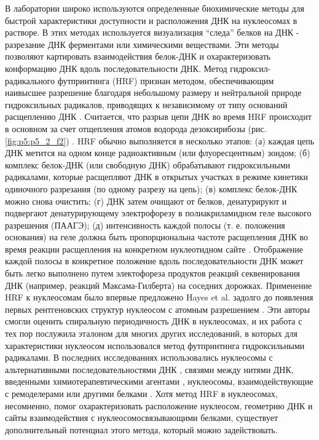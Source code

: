 В лаборатории широко используются определенные биохимические методы для быстрой характеристики доступности и расположения ДНК на нуклеосомах в растворе. В этих методах используется визуализация ``следа'' белков на ДНК - разрезание ДНК ферментами или химическими веществами. Эти методы позволяют картировать взаимодействия белок-ДНК и охарактеризовать конформацию ДНК вдоль последовательности ДНК. Метод гидроксил-радикального футпринтинга (HRF) признан методом, обеспечивающим наивысшее разрешение благодаря небольшому размеру и нейтральной природе гидроксильных радикалов, приводящих к независимому от типу оснований расщеплению ДНК \cite{jain_footprinting_2008-1}. Считается, что разрыв цепи ДНК во время HRF происходит в основном за счет отщепления атомов водорода дезоксирибозы (рис.\ref{fig:p5:p5_2_f2}) \cite{pogozelski_oxidative_1998}. HRF обычно выполняется в несколько этапов: (а) каждая цепь ДНК метится на одном конце радиоактивным (или флуоресцентным) зондом; (б) комплекс белок-ДНК (или свободную ДНК) обрабатывают гидроксильными радикалами, которые расщепляют ДНК в открытых участках в режиме кинетики одиночного разрезания (по одному разрезу на цепь); (в) комплекс белок-ДНК можно снова очистить; (г) ДНК затем очищают от белков, денатурируют и подвергают денатурирующему электрофорезу в полиакриламидном геле высокого разрешения (ПААГЭ); (д) интенсивность каждой полосы (т. е. положения основания) на геле должна быть пропорциональна частоте расщепления ДНК во время реакции расщепления на конкретном нуклеотидном сайте \cite{jain_footprinting_2008-1}. Отображение каждой полосы в конкретное положение вдоль последовательности ДНК может быть легко выполнено путем электофореза продуктов реакций секвенирования ДНК (например, реакций Максама-Гилберта) на соседних дорожках.
Применение HRF к нуклеосомам было впервые предложено Hayes et al. задолго до появления первых рентгеновских структур нуклеосом с атомным разрешением \cite{hayes_structure_1990,hayes_histone_1991-1,hayes_histone_1991,churchill_detection_1990}. Эти авторы смогли оценить спиральную периодичность ДНК в нуклеосомах, и их работа с тех пор послужила эталоном для многих других исследований, в которых для характеристики нуклеосом использовался метод футпринтинга гидроксильными радикалами. В последних исследованиях использовались нуклеосомы с альтернативными последовательностями ДНК \cite{widlund_nucleosome_1999,bjorklund_attenuation_2006,morozov_using_2009}, связями между нитями ДНК, введенными химиотерапевтическими агентами \cite{bjorklund_attenuation_2006}, нуклеосомы, взаимодействующие с ремоделерами \cite{schwanbeck_spatial_2004} или другими белками \cite{syed_single-base_2010}. Хотя метод HRF в нуклеосомах, несомненно, помог охарактеризовать расположение нуклеосом, геометрию ДНК и сайты взаимодействия с нуклеосомосвязывающими белками, существует дополнительный потенциал этого метода, который можно задействовать.
